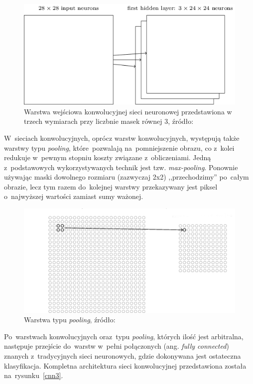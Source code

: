 \begin{figure}[ht!]
\centering
\includegraphics[scale=0.6]{res/cnn2.png}
\caption[Caption for LOF]{Warstwa wejściowa konwolucyjnej sieci neuronowej przedstawiona w trzech wymiarach przy liczbnie masek równej 3, źródło:\cite{nielsen}\label{cnn2}} 
\end{figure}
\noindent
W~sieciach konwolucyjnych, oprócz warstw konwolucyjnych, występują także warstwy typu \textit{pooling}, które~pozwalają na~pomniejszenie obrazu, co z~kolei redukuje w~pewnym stopniu koszty związane z~obliczeniami. Jedną z~podstawowych wykorzystywanych technik jest tzw. \textit{max-pooling}. Ponownie używając maski dowolnego rozmiaru (zazwyczaj 2x2) ,,przechodzimy'' po~całym obrazie, lecz tym razem do~kolejnej warstwy przekazywany jest piksel o~najwyższej wartości zamiast sumy ważonej.
\begin{figure}[ht!]
\centering
\includegraphics[scale=0.6]{res/pooling.png}
\caption[Caption for LOF]{Warstwa typu \textit{pooling}, źródło:\cite{nielsen}\label{pooling}} 
\end{figure}
\noindent
Po~warstwach konwolucyjnych oraz~typu \textit{pooling}, których ilość jest arbitralna, następuje przejście do~warstw w~pełni połączonych (ang. \textit{fully connected}) znanych z~tradycyjnych sieci neuronowych, gdzie dokonywana jest ostateczna klasyfikacja. Kompletna architektura sieci konwolucyjnej przedstawiona została na~rysunku~\ref{cnn3}.

